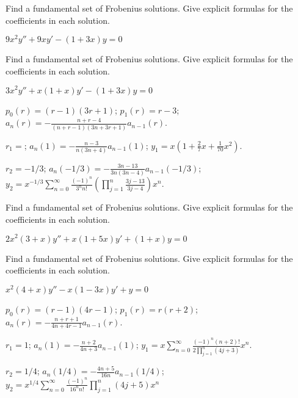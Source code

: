 \documentclass{ximera}
\begin{document}
\begin{problem}\label{exer:7.5.19} 
Find a
fundamental set of Frobenius solutions. Give explicit formulas for the
coefficients in each solution.

$9x^2y''+9xy'-(1+3x)y=0$

\end{problem}

\begin{problem}\label{exer:7.5.20} 
Find a
fundamental set of Frobenius solutions. Give explicit formulas for the
coefficients in each solution.

$3x^2y''+x(1+x)y'-(1+3x)y=0$

\begin{solution}
    $p_0(r)=(r-1)(3r+1)$;
$p_1(r)=r-3$;
$a_n(r)=-\frac{n+r-4}{ (n+r-1)(3n+3r+1)}a_{n-1}(r)$.

$r_1=$;
$a_n(1)=-\frac{n-3}{ n(3n+4)}a_{n-1}(1)$;
$y_1=x\left(1+\frac{2}{7}x+\frac{1}{70}x^2\right)$.

$r_2=-1/3$;
$a_n(-1/3)=-\frac{3n-13}{ 3n(3n-4)}a_{n-1}(-1/3)$;
$y_2=x^{-1/3}\sum_{n=0}^\infty\frac{(-1)^n}{3^nn!}\left(\prod_{j=1}^n
\frac{3j-13}{3j-4}\right)x^n$.
\end{solution}

\end{problem}

\begin{problem}\label{exer:7.5.21} 
Find a
fundamental set of Frobenius solutions. Give explicit formulas for the
coefficients in each solution.

$2x^2(3+x)y''+x(1+5x)y'+(1+x)y=0$

\end{problem}

\begin{problem}\label{exer:7.5.22} 
Find a
fundamental set of Frobenius solutions. Give explicit formulas for the
coefficients in each solution.

$x^2(4+x)y''-x(1-3x)y'+y=0$

\begin{solution}
    $p_0(r)=(r-1)(4r-1)$;
$p_1(r)=r(r+2)$;
$a_n(r)=-\frac{n+r+1}{ 4n+4r-1}a_{n-1}(r)$.

$r_1=1$;
$a_n(1)= -\frac{n+2}{ 4n+3}a_{n-1}(1)$;
$y_1=x\sum_{n=0}^\infty\frac{(-1)^n(n+2)!}{2\prod_{j=1}^n(4j+3)}
x^n$.

$r_2=1/4$;
$a_n(1/4)=-\frac{4n+5}{ 16n}a_{n-1}(1/4)$;
$y_2=x^{1/4}\sum_{n=0}^\infty\frac{(-1)^n}{16^nn!}\prod_{j=1}^n(4j+5)
x^n$
\end{solution}

\end{problem}
\end{document}
